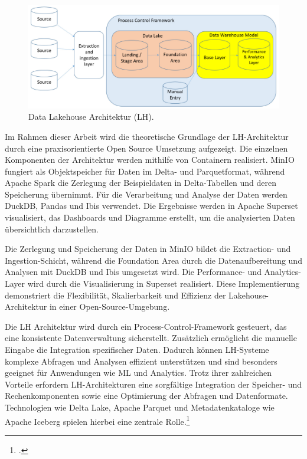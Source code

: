 \begin{figure}[htb]
    \centering
    \includegraphics[width=0.7\linewidth]{graphics/lh-architecture.png}
    \caption[Data Lakehouse Architektur]{Data Lakehouse Architektur (LH).\footnotemark}
    \label{fig:DataLakehouse-Architecture} 
    \end{figure}

Im Rahmen dieser Arbeit wird die theoretische Grundlage der \ac{LH}-Architektur durch eine praxisorientierte Open Source Umsetzung aufgezeigt. Die einzelnen Komponenten der Architektur werden mithilfe von Containern realisiert. MinIO fungiert als Objektspeicher für Daten im Delta- und Parquetformat, während Apache Spark die Zerlegung der Beispieldaten in Delta-Tabellen und deren Speicherung übernimmt. Für die Verarbeitung und Analyse der Daten werden DuckDB, Pandas und Ibis verwendet. Die Ergebnisse werden in Apache Superset visualisiert, das Dashboards und Diagramme erstellt, um die analysierten Daten übersichtlich darzustellen.

Die Zerlegung und Speicherung der Daten in MinIO bildet die Extraction- und Ingestion-Schicht, während die Foundation Area durch die Datenaufbereitung und Analysen mit DuckDB und Ibis umgesetzt wird. Die Performance- und Analytics-Layer wird durch die Visualisierung in Superset realisiert. Diese Implementierung demonstriert die Flexibilität, Skalierbarkeit und Effizienz der Lakehouse-Architektur in einer Open-Source-Umgebung.

Die \ac{LH} Architektur wird durch ein Process-Control-Framework gesteuert, das eine konsistente Datenverwaltung sicherstellt. Zusätzlich ermöglicht die manuelle Eingabe die Integration spezifischer Daten. Dadurch können \ac{LH}-Systeme komplexe Abfragen und Analysen effizient unterstützen und sind besonders geeignet für Anwendungen wie \ac{ML} und Analytics. Trotz ihrer zahlreichen Vorteile erfordern \ac{LH}-Architekturen eine sorgfältige Integration der Speicher- und Rechenkomponenten sowie eine Optimierung der Abfragen und Datenformate. Technologien wie Delta Lake, Apache Parquet und Metadatenkataloge wie Apache Iceberg spielen hierbei eine zentrale Rolle.\footcite[Vgl.][S. 6]{mazumdarDataLakehouseData2023}